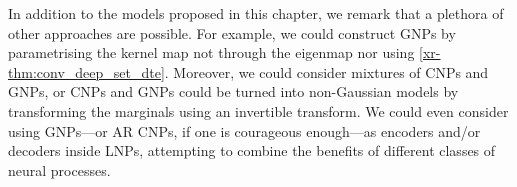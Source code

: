 \documentclass[12pt]{report}
\newcommand{\xrprefix}[1]{xr-#1}
\begin{document}
In addition to the models proposed in this chapter, we remark that a plethora of other approaches are possible.
For example, we could construct GNPs by parametrising the kernel map not through the eigenmap nor using \cref{\xrprefix{thm:conv_deep_set_dte}}.
Moreover, we could consider mixtures of CNPs and GNPs, or CNPs and GNPs could be turned into non-Gaussian models by transforming the marginals using an invertible transform.
We could even consider using GNPs---or AR CNPs, if one is courageous enough---as encoders and/or decoders inside LNPs,
attempting to combine the benefits of different classes of neural processes.
\end{document}
